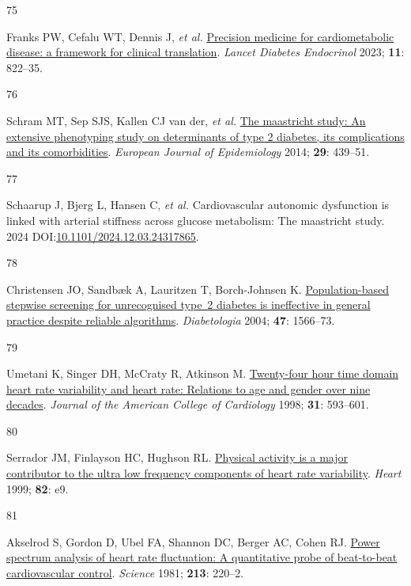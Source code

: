\documentclass[
  letterpaper,
  headsepline=true,
  open=any]{scrbook}
\newlength{\cslhangindent}
\newlength{\csllabelwidth}
\newlength{\cslentryspacingunit} %
\newenvironment{CSLReferences}[2] %
 {%
  \setlength{\parindent}{0pt}
  \ifodd #1
  \let\oldpar\par
  \def\par{\hangindent=\cslhangindent\oldpar}
  \fi
  \setlength{\parskip}{#2\cslentryspacingunit}
 }%
 {}
\newcommand{\CSLLeftMargin}[1]{\parbox[t]{\csllabelwidth}{#1}}
\newcommand{\CSLRightInline}[1]{\parbox[t]{\linewidth - \csllabelwidth}{#1}\break}
\begin{document}
\begin{CSLReferences}{0}{0}
\leavevmode{}%
\CSLLeftMargin{75 }%
\CSLRightInline{Franks PW, Cefalu WT, Dennis J, \emph{et al.}
\href{https://doi.org/10.1016/s2213-8587(23)00165-1}{Precision medicine
for cardiometabolic disease: a framework for clinical translation}.
\emph{Lancet Diabetes Endocrinol} 2023; \textbf{11}: 822--35.}

\leavevmode{}%
\CSLLeftMargin{76 }%
\CSLRightInline{Schram MT, Sep SJS, Kallen CJ van der, \emph{et al.}
\href{https://doi.org/10.1007/s10654-014-9889-0}{The maastricht study:
An extensive phenotyping study on determinants of type 2 diabetes, its
complications and its comorbidities}. \emph{European Journal of
Epidemiology} 2014; \textbf{29}: 439--51.}

\leavevmode{}%
\CSLLeftMargin{77 }%
\CSLRightInline{Schaarup J, Bjerg L, Hansen C, \emph{et al.}
Cardiovascular autonomic dysfunction is linked with arterial stiffness
across glucose metabolism: The maastricht study. 2024
DOI:\href{https://doi.org/10.1101/2024.12.03.24317865}{10.1101/2024.12.03.24317865}.}

\leavevmode{}%
\CSLLeftMargin{78 }%
\CSLRightInline{Christensen JO, Sandbæk A, Lauritzen T, Borch-Johnsen K.
\href{https://doi.org/10.1007/s00125-004-1496-2}{Population-based
stepwise screening for unrecognised type~2 diabetes is ineffective in
general practice despite reliable algorithms}. \emph{Diabetologia} 2004;
\textbf{47}: 1566--73.}

\leavevmode{}%
\CSLLeftMargin{79 }%
\CSLRightInline{Umetani K, Singer DH, McCraty R, Atkinson M.
\href{https://doi.org/10.1016/S0735-1097(97)00554-8}{Twenty-four hour
time domain heart rate variability and heart rate: Relations to age and
gender over nine decades}. \emph{Journal of the American College of
Cardiology} 1998; \textbf{31}: 593--601.}

\leavevmode{}%
\CSLLeftMargin{80 }%
\CSLRightInline{Serrador JM, Finlayson HC, Hughson RL.
\href{https://doi.org/10.1136/hrt.82.6.e9}{Physical activity is a major
contributor to the ultra low frequency components of heart rate
variability}. \emph{Heart} 1999; \textbf{82}: e9.}

\leavevmode{}%
\CSLLeftMargin{81 }%
\CSLRightInline{Akselrod S, Gordon D, Ubel FA, Shannon DC, Berger AC,
Cohen RJ. \href{https://doi.org/10.1126/science.6166045}{Power spectrum
analysis of heart rate fluctuation: A quantitative probe of beat-to-beat
cardiovascular control}. \emph{Science} 1981; \textbf{213}: 220--2.}


\end{CSLReferences}
\end{document}
